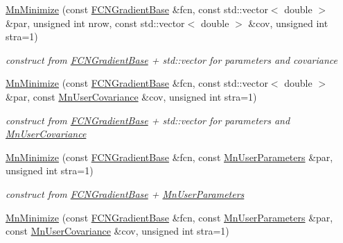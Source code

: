 \begin{DoxyCompactItemize}
\mbox{\hyperlink{classROOT_1_1Minuit2_1_1MnMinimize_ad3e1fd3c735a330f90f37e8e4ac3efce}{Mn\+Minimize}} (const \mbox{\hyperlink{classROOT_1_1Minuit2_1_1FCNGradientBase}{F\+C\+N\+Gradient\+Base}} \&fcn, const std\+::vector$<$ double $>$ \&par, unsigned int nrow, const std\+::vector$<$ double $>$ \&cov, unsigned int stra=1)
\begin{DoxyCompactList}\small\item\em construct from \mbox{\hyperlink{classROOT_1_1Minuit2_1_1FCNGradientBase}{F\+C\+N\+Gradient\+Base}} + std\+::vector for parameters and covariance \end{DoxyCompactList}\item 
\mbox{\hyperlink{classROOT_1_1Minuit2_1_1MnMinimize_a4f00e31f1d1bd5bd1e8771d9434eb3f7}{Mn\+Minimize}} (const \mbox{\hyperlink{classROOT_1_1Minuit2_1_1FCNGradientBase}{F\+C\+N\+Gradient\+Base}} \&fcn, const std\+::vector$<$ double $>$ \&par, const \mbox{\hyperlink{classROOT_1_1Minuit2_1_1MnUserCovariance}{Mn\+User\+Covariance}} \&cov, unsigned int stra=1)
\begin{DoxyCompactList}\small\item\em construct from \mbox{\hyperlink{classROOT_1_1Minuit2_1_1FCNGradientBase}{F\+C\+N\+Gradient\+Base}} + std\+::vector for parameters and \mbox{\hyperlink{classROOT_1_1Minuit2_1_1MnUserCovariance}{Mn\+User\+Covariance}} \end{DoxyCompactList}\item 
\mbox{\hyperlink{classROOT_1_1Minuit2_1_1MnMinimize_a7ae2da481677eb3b7fcf3b77a8dee92b}{Mn\+Minimize}} (const \mbox{\hyperlink{classROOT_1_1Minuit2_1_1FCNGradientBase}{F\+C\+N\+Gradient\+Base}} \&fcn, const \mbox{\hyperlink{classROOT_1_1Minuit2_1_1MnUserParameters}{Mn\+User\+Parameters}} \&par, unsigned int stra=1)
\begin{DoxyCompactList}\small\item\em construct from \mbox{\hyperlink{classROOT_1_1Minuit2_1_1FCNGradientBase}{F\+C\+N\+Gradient\+Base}} + \mbox{\hyperlink{classROOT_1_1Minuit2_1_1MnUserParameters}{Mn\+User\+Parameters}} \end{DoxyCompactList}\item 
\mbox{\hyperlink{classROOT_1_1Minuit2_1_1MnMinimize_a669845a1aaba36456664f1e98a615e25}{Mn\+Minimize}} (const \mbox{\hyperlink{classROOT_1_1Minuit2_1_1FCNGradientBase}{F\+C\+N\+Gradient\+Base}} \&fcn, const \mbox{\hyperlink{classROOT_1_1Minuit2_1_1MnUserParameters}{Mn\+User\+Parameters}} \&par, const \mbox{\hyperlink{classROOT_1_1Minuit2_1_1MnUserCovariance}{Mn\+User\+Covariance}} \&cov, unsigned int stra=1)

\end{DoxyCompactItemize}
